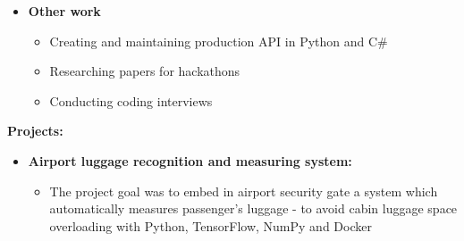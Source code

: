 \documentclass[10pt,a4paper,ragged2e,withhyper, normalphoto]{altacv}
\begin{document}
\begin{paracol}{2}
\begin{itemize}
        \item  \textbf{\textcolor{DarkPastelRed}{Other work}}
            \begin{itemize}
                \item Creating and maintaining production API in Python and C\#
                \item Researching papers for hackathons
                \item Conducting coding interviews
            \end{itemize}
    \end{itemize}
    
    \textbf{Projects:}
    \begin{itemize}
        \item \textbf{\textcolor{DarkPastelRed}{Airport luggage recognition and measuring system:}}
        \begin{itemize}
            \item The project goal was to embed in airport security gate a system which automatically measures passenger's luggage - to avoid cabin luggage space overloading with Python, TensorFlow, NumPy and Docker

\end{itemize}
\end{itemize}
\end{paracol}
\end{document}
